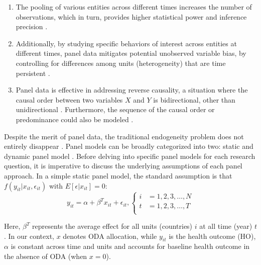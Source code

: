\begin{enumerate}[i]
    \item The pooling of various entities across different times increases the number of observations, which in turn, provides higher statistical power and inference precision \parencite{gujarati2004econometrie, hsiao2007panel, cameron2005microeconometrics}.
    
    \item Additionally, by studying specific behaviors of interest across entities at different times, panel data mitigates potential unobserved variable bias, by controlling for differences among units (heterogeneity) that are time persistent \parencite{hsiao2007panel, allison2017maximum}.
    \item Panel data is effective in addressing reverse causality, a situation where the causal order between two variables $X$ and $Y$ is bidirectional, other than unidirectional \parencite{berrington2006overview, allison2017maximum}. Furthermore, the sequence of the causal order or predominance could also be modeled \parencite{berrington2006overview, seddig2020maximum}.  
\end{enumerate}

Despite the merit of panel data, the traditional endogeneity problem does not entirely disappear \parencite{berrington2006overview}. Panel models can be broadly categorized into two: static and dynamic panel model \parencite{seddig2020maximum}. Before delving into specific panel models for each research question, it is imperative to discuss the underlying assumptions of each panel approach. In a simple static panel model, the standard assumption is that $f(y_{it}|x_{it}, \epsilon_{it})$ with $E[\epsilon | x_{it}]  = 0$:
\begin{equation}
    y_{it} = \alpha + \beta^T x_{it} + \epsilon_{it},
    \begin{cases}
        i & = 1, 2, 3, \ldots, N \\
        t & = 1, 2, 3, \ldots, T \\
    \end{cases}
    \label{eq1}
\end{equation}

Here, $\beta^T$ represents the average effect for all units (countries) $i$ at all time (year) $t$. In our context, $x$ denotes ODA allocation, while $y_{it}$ is the health outcome (HO), $\alpha$ is constant across time and units and accounts for baseline health outcome in the absence of ODA (when $x=0$).
  
